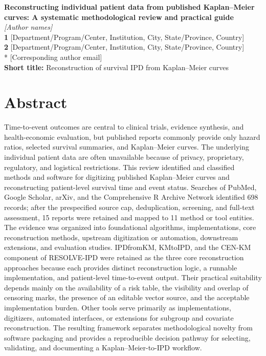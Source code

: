 \documentclass[10pt,letterpaper]{article}
\begin{document}
\vspace*{0.2in}
\begin{flushleft}
{\Large\textbf{Reconstructing individual patient data from published Kaplan--Meier curves: A systematic methodological review and practical guide}}
\\[12pt]
\textit{[Author names]}\\[8pt]
\textbf{1} [Department/Program/Center, Institution, City, State/Province, Country]\\
\textbf{2} [Department/Program/Center, Institution, City, State/Province, Country]\\[8pt]
* [Corresponding author email]\\[12pt]
\textbf{Short title:} Reconstruction of survival IPD from Kaplan--Meier curves
\end{flushleft}
\clearpage
\section*{Abstract}

Time-to-event outcomes are central to clinical trials, evidence synthesis, and health-economic evaluation, but published reports commonly provide only hazard ratios, selected survival summaries, and Kaplan--Meier curves. The underlying individual patient data are often unavailable because of privacy, proprietary, regulatory, and logistical restrictions. This review identified and classified methods and software for digitizing published Kaplan--Meier curves and reconstructing patient-level survival time and event status. Searches of PubMed, Google Scholar, arXiv, and the Comprehensive R Archive Network identified 698 records; after the prespecified source cap, deduplication, screening, and full-text assessment, 15 reports were retained and mapped to 11 method or tool entities. The evidence was organized into foundational algorithms, implementations, core reconstruction methods, upstream digitization or automation, downstream extensions, and evaluation studies. IPDfromKM, KMtoIPD, and the CEN-KM component of RESOLVE-IPD were retained as the three core reconstruction approaches because each provides distinct reconstruction logic, a runnable implementation, and patient-level time-to-event output. Their practical suitability depends mainly on the availability of a risk table, the visibility and overlap of censoring marks, the presence of an editable vector source, and the acceptable implementation burden. Other tools serve primarily as implementations, digitizers, automated interfaces, or extensions for subgroup and covariate reconstruction. The resulting framework separates methodological novelty from software packaging and provides a reproducible decision pathway for selecting, validating, and documenting a Kaplan--Meier-to-IPD workflow.
\end{document}
